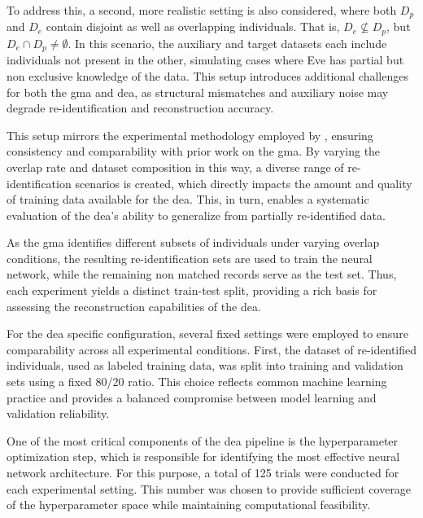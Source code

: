 To address this, a second, more realistic setting is also considered, where both $D_p$ and $D_e$ contain disjoint as well as overlapping individuals.
That is, $D_e \nsubseteq D_p$, but $D_e \cap D_p \neq \emptyset$.
In this scenario, the auxiliary and target datasets each include individuals not present in the other, simulating cases where Eve has partial but non exclusive knowledge of the data.
This setup introduces additional challenges for both the \ac{gma} and \ac{dea}, as structural mismatches and auxiliary noise may degrade re-identification and reconstruction accuracy.

This setup mirrors the experimental methodology employed by \cite{schaefer2024}, ensuring consistency and comparability with prior work on the \ac{gma}.
By varying the overlap rate and dataset composition in this way, a diverse range of re-identification scenarios is created, which directly impacts the amount and quality of training data available for the \ac{dea}.
This, in turn, enables a systematic evaluation of the \ac{dea}'s ability to generalize from partially re-identified data.

As the \ac{gma} identifies different subsets of individuals under varying overlap conditions, the resulting re-identification sets are used to train the neural network, while the remaining non matched records serve as the test set.
Thus, each experiment yields a distinct train-test split, providing a rich basis for assessing the reconstruction capabilities of the \ac{dea}.


For the \ac{dea} specific configuration, several fixed settings were employed to ensure comparability across all experimental conditions.
First, the dataset of re-identified individuals, used as labeled training data, was split into training and validation sets using a fixed 80/20 ratio.
This choice reflects common machine learning practice and provides a balanced compromise between model learning and validation reliability.

One of the most critical components of the \ac{dea} pipeline is the hyperparameter optimization step, which is responsible for identifying the most effective neural network architecture.
For this purpose, a total of 125 trials were conducted for each experimental setting.
This number was chosen to provide sufficient coverage of the hyperparameter space while maintaining computational feasibility.

